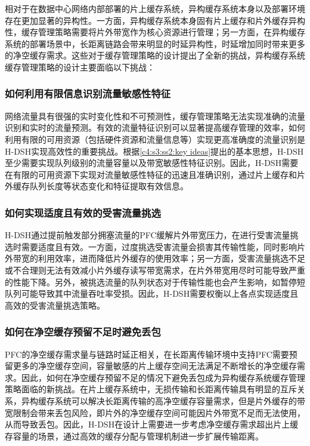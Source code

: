 
相对于在数据中心网络内部部署的片上缓存系统，异构缓存系统本身以及部署环境存在更加显著的异构性。一方面，异构缓存系统本身固有片上缓存和片外缓存异构性，缓存管理策略需要将片外带宽作为核心资源进行管理；另一方面，在异构缓存系统的部署场景中，长距离链路会带来明显的时延异构性，时延增加同时带来更多的净空缓存需求。这些对于缓存管理策略的设计提出了全新的挑战，异构缓存系统缓存管理策略的设计主要面临以下挑战：

\subsubsection{如何利用有限信息识别流量敏感性特征}

网络流量具有很强的实时变化性和不可预测性，缓存管理策略无法实现准确的流量识别和实时的流量预测。有效的流量特征识别可以显著提高缓存管理的效率，如何利用有限的可用资源（包括硬件资源和流量信息等）实现更高准确度的流量识别是H-DSH实现高效性的重要挑战。根据\ref{c4:s3:ss2:key ideas}提出的基本思想，H-DSH至少需要实现队列级别的流量容量以及带宽敏感性特征识别。因此，H-DSH需要在有限的可用资源下实现对流量敏感性特征的迅速且准确识别，通过片上缓存和片外缓存队列长度等状态变化和特征提取有效信息。

\subsubsection{如何实现适度且有效的受害流量挑选}

H-DSH通过提前触发部分拥塞流量的PFC缓解片外带宽压力，在进行受害流量挑选时需要适度且有效。一方面，过度挑选受害流量会损害其传输性能，同时影响片外带宽的利用效率，进而降低片外缓存的使用效率；另一方面，受害流量挑选不足或不合理则无法有效减小片外缓存读写带宽需求，在片外带宽用尽时可能导致严重的性能下降。另外，被挑选流量的队列状态对于传输性能也会产生影响，如暂停短队列可能导致其中流量吞吐率受损。因此，H-DSH需要权衡以上各点实现适度且高效的受害流量挑选策略。

\subsubsection{如何在净空缓存预留不足时避免丢包}

PFC的净空缓存需求量与链路时延正相关，在长距离传输环境中支持PFC需要预留更多的净空缓存空间，容量敏感的片上缓存空间无法满足不断增长的净空缓存需求。因此，如何在净空缓存预留不足的情况下避免丢包成为异构缓存系统缓存管理策略面临的新挑战。在片上缓存系统中，无损传输和长距离传输具有明显的互斥关系，异构缓存系统可以解决长距离传输的高净空缓存容量需求，但是片外缓存的带宽限制会带来丢包风险，即片外的净空缓存空间可能因片外带宽不足而无法使用，从而导致丢包。因此，H-DSH在设计上需要进一步考虑净空缓存需求超出片上缓存容量的场景，通过高效的缓存分配与管理机制进一步扩展传输距离。


